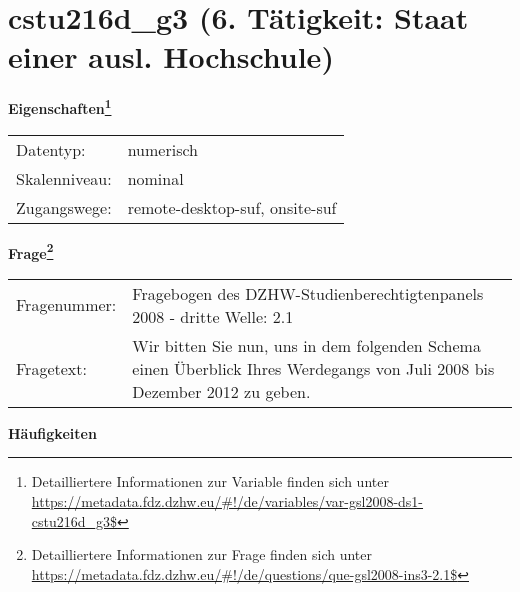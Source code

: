 
    \setcounter{footnote}{0}

    \vspace*{-1.8cm}
	\section{cstu216d\_g3 (6. Tätigkeit: Staat einer ausl. Hochschule)}
	\label{section:cstu216d_g3}



    \vspace*{0.5cm}
    \noindent\textbf{Eigenschaften\footnote{Detailliertere Informationen zur Variable finden sich unter
		\url{https://metadata.fdz.dzhw.eu/\#!/de/variables/var-gsl2008-ds1-cstu216d_g3$}}}\\
	\begin{tabularx}{\hsize}{@{}lX}
	Datentyp: & numerisch \\
	Skalenniveau: & nominal \\
	Zugangswege: &
	  remote-desktop-suf, 
	  onsite-suf
 \\
    \end{tabularx}



				\vspace*{0.5cm}
                \noindent\textbf{Frage\footnote{Detailliertere Informationen zur Frage finden sich unter
		              \url{https://metadata.fdz.dzhw.eu/\#!/de/questions/que-gsl2008-ins3-2.1$}}}\\
				\begin{tabularx}{\hsize}{@{}lX}
					Fragenummer: &
					  Fragebogen des DZHW-Studienberechtigtenpanels 2008 - dritte Welle:
					  2.1
 \\
					Fragetext: & Wir bitten Sie nun, uns in dem folgenden Schema einen Überblick Ihres Werdegangs von Juli 2008 bis Dezember 2012 zu geben. \\
				\end{tabularx}





        		\vspace*{0.5cm}
                \noindent\textbf{Häufigkeiten}

